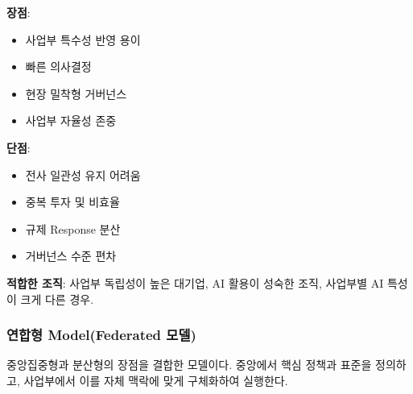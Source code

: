 \textbf{장점}:
\begin{itemize}
 \item 사업부 특수성 반영 용이
 \item 빠른 의사결정
 \item 현장 밀착형 거버넌스
 \item 사업부 자율성 존중
\end{itemize}

\textbf{단점}:
\begin{itemize}
 \item 전사 일관성 유지 어려움
 \item 중복 투자 및 비효율
 \item 규제 Response 분산
 \item 거버넌스 수준 편차
\end{itemize}

\textbf{적합한 조직}: 
사업부 독립성이 높은 대기업, AI 활용이 성숙한 조직, 
사업부별 AI 특성이 크게 다른 경우.


\subsubsection{연합형 Model(Federated 모델)}

중앙집중형과 분산형의 장점을 결합한 모델이다. 
중앙에서 핵심 정책과 표준을 정의하고, 
사업부에서 이를 자체 맥락에 맞게 구체화하여 실행한다.

